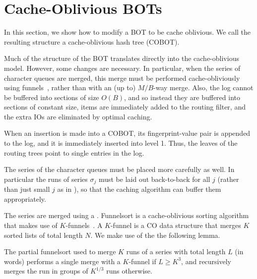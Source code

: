 \section{Cache-Oblivious BOTs}\label{sec:boa-cacheoblivious}

In this section, we show how to modify a BOT to be cache oblivious.  We call
the resulting structure a cache-oblivious hash tree (COBOT). 

Much of the structure of the BOT translates directly into the cache-oblivious
model. However, some changes are necessary. In particular, when the series of
character queues are merged, this merge must be performed cache-obliviously
using funnels~\cite{DBLP:conf/focs/FrigoLPR99}, rather than with an (up to)
$M/B$-way merge. Also, the log cannot be buffered into sections of size $O(B)$,
and so instead they are buffered into sections of constant size, items are
immediately added to the routing filter, and the extra IOs are eliminated by
optimal caching.

When an insertion is made into a COBOT, its fingerprint-value pair is
appended to the log, and it is immediately inserted into level 1. Thus, the
leaves of the routing trees point to single entries in the log.

The series of the character queues must be placed more carefully as well. In
particular the runs of series $\sigma_j$ must be laid out back-to-back for all
$j$ (rather than just small $j$ as in ), so that the
caching algorithm can buffer them appropriately.

The series are merged using a . Funnelsort is a
cache-oblivious sorting algorithm that makes use of
$K$-funnels~\cite{DBLP:conf/focs/FrigoLPR99}. A $K$-funnel is a CO data structure
that merges $K$ sorted lists of total length $N$. We make use of the the
following lemma.

	
The partial funnelsort used to merge $K$ runs of a series with total length $L$
(in words) performs a single merge with a $K$-funnel if $L \geq K^3$, and
recursively merges the run in groups of $K^{1/3}$ runs otherwise.

